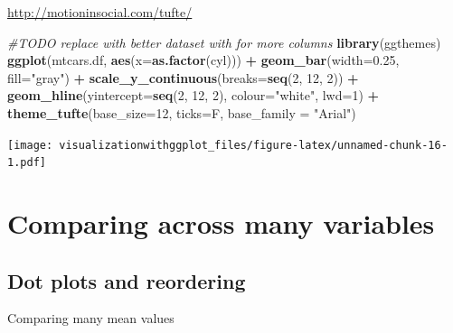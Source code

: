 \documentclass[]{krantz}
\makeatletter
\newenvironment{Shaded}{\begin{snugshade}}{\end{snugshade}}
\newcommand{\KeywordTok}[1]{\textcolor[rgb]{0.13,0.29,0.53}{\textbf{#1}}}
\newcommand{\DataTypeTok}[1]{\textcolor[rgb]{0.13,0.29,0.53}{#1}}
\newcommand{\DecValTok}[1]{\textcolor[rgb]{0.00,0.00,0.81}{#1}}
\newcommand{\FloatTok}[1]{\textcolor[rgb]{0.00,0.00,0.81}{#1}}
\newcommand{\StringTok}[1]{\textcolor[rgb]{0.31,0.60,0.02}{#1}}
\newcommand{\CommentTok}[1]{\textcolor[rgb]{0.56,0.35,0.01}{\textit{#1}}}
\newcommand{\OperatorTok}[1]{\textcolor[rgb]{0.81,0.36,0.00}{\textbf{#1}}}
\newcommand{\NormalTok}[1]{#1}
\newenvironment{kframe}{%
\medskip{}
\setlength{\fboxsep}{.8em}
 \def\at@end@of@kframe{}%
 \ifinner\ifhmode%
  \def\at@end@of@kframe{\end{minipage}}%
  \begin{minipage}{\columnwidth}%
 \fi\fi%
 \def\FrameCommand##1{\hskip\@totalleftmargin \hskip-\fboxsep
 \colorbox{shadecolor}{##1}\hskip-\fboxsep
     \hskip-\linewidth \hskip-\@totalleftmargin \hskip\columnwidth}%
 \MakeFramed {\advance\hsize-\width
   \@totalleftmargin\z@ \linewidth\hsize
   \@setminipage}}%
 {\par\unskip\endMakeFramed%
 \at@end@of@kframe}
\renewenvironment{Shaded}{\begin{kframe}}{\end{kframe}}
\theoremstyle{definition}
\theoremstyle{definition}
\theoremstyle{definition}
\theoremstyle{remark}
\makeatother
\begin{document}
\url{http://motioninsocial.com/tufte/}

\begin{Shaded}
\begin{Highlighting}[]
\CommentTok{#TODO replace with better dataset with for more columns}
\KeywordTok{library}\NormalTok{(ggthemes)}
\KeywordTok{ggplot}\NormalTok{(mtcars.df, }\KeywordTok{aes}\NormalTok{(}\DataTypeTok{x=}\KeywordTok{as.factor}\NormalTok{(cyl))) }\OperatorTok{+}\StringTok{ }
\StringTok{  }\KeywordTok{geom_bar}\NormalTok{(}\DataTypeTok{width=}\FloatTok{0.25}\NormalTok{, }\DataTypeTok{fill=}\StringTok{"gray"}\NormalTok{) }\OperatorTok{+}\StringTok{  }
\StringTok{  }\KeywordTok{scale_y_continuous}\NormalTok{(}\DataTypeTok{breaks=}\KeywordTok{seq}\NormalTok{(}\DecValTok{2}\NormalTok{, }\DecValTok{12}\NormalTok{, }\DecValTok{2}\NormalTok{)) }\OperatorTok{+}\StringTok{ }
\StringTok{  }\KeywordTok{geom_hline}\NormalTok{(}\DataTypeTok{yintercept=}\KeywordTok{seq}\NormalTok{(}\DecValTok{2}\NormalTok{, }\DecValTok{12}\NormalTok{, }\DecValTok{2}\NormalTok{), }\DataTypeTok{colour=}\StringTok{"white"}\NormalTok{, }\DataTypeTok{lwd=}\DecValTok{1}\NormalTok{) }\OperatorTok{+}
\StringTok{  }\KeywordTok{theme_tufte}\NormalTok{(}\DataTypeTok{base_size=}\DecValTok{12}\NormalTok{, }\DataTypeTok{ticks=}\NormalTok{F, }\DataTypeTok{base_family =} \StringTok{"Arial"}\NormalTok{) }
\end{Highlighting}
\end{Shaded}

\texttt{[image: visualizationwithggplot\_files/figure-latex/unnamed-chunk-16-1.pdf]}

\section{Comparing across many
variables}\label{comparing-across-many-variables}

\subsection{Dot plots and reordering}\label{dot-plots-and-reordering}

Comparing many mean values
\end{document}

